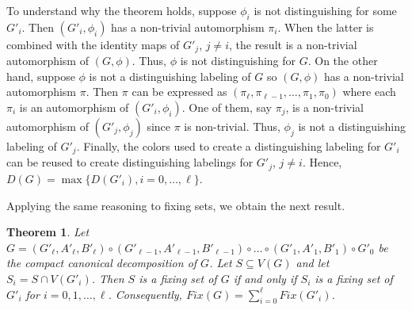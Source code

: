 \documentclass[11pt]{article}
\newtheorem{theorem}[df]{Theorem}
\begin{document}
  To understand why the theorem holds, suppose $\phi_i$ is not distinguishing for some $G'_i$.  Then $(G'_i, \phi_i)$ has a non-trivial automorphism $\pi_i$.   When the latter is  combined with the identity maps of $G'_j$, $j \neq i$,  the result is a non-trivial automorphism of $(G, \phi)$.  Thus, $\phi$ is not distinguishing for $G$. 
  On the other hand, suppose $\phi$ is not a distinguishing labeling of $G$ so $(G, \phi)$ has a non-trivial automorphism $\pi$.  Then $\pi$ can be expressed as $(\pi_\ell, \pi_{\ell-1}, \hdots, \pi_1, \pi_0)$ where each $\pi_i$ is an automorphism of $(G'_i, \phi_i)$.   One of them, say $\pi_j$,   is a non-trivial automorphism of $(G'_j, \phi_j)$ since $\pi$ is non-trivial. Thus, $\phi_j$ is not a distinguishing labeling of $G'_j$. Finally, the colors used to create a distinguishing labeling for $G'_i$ can be reused to create distinguishing labelings for $G'_j$, $j \neq i$.  Hence,  $D(G) = \max \{D(G'_i), i = 0, \hdots, \ell\}$.




Applying the same reasoning to fixing sets, we obtain the next result.

\begin{theorem} 
Let $G= (G'_\ell , A'_\ell, B'_\ell) \circ (G'_{\ell-1}, A'_{\ell-1}, B'_{\ell-1})  \circ \hdots \circ (G'_1, A'_1, B'_1) \circ G'_0$ be the compact canonical decomposition of $G$.  Let $S \subseteq V(G)$ and let $S_i = S \cap V(G'_i)$.  Then $S$ is a fixing set of $G$ if and only if $S_i$ is a fixing set of $G'_i$    for $i = 0, 1, \hdots, \ell$.  Consequently, $Fix(G) = \sum_{i=0}^\ell Fix(G'_i)$.  
\label{fixthm}
\end{theorem}

\end{document}
